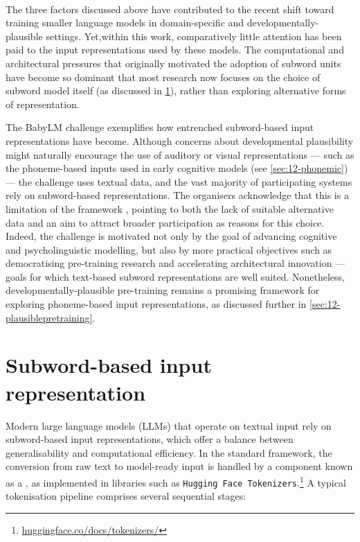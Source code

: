 \paragraph{} The three factors discussed above have contributed to the recent shift toward training smaller language models in domain-specific and developmentally-plausible settings. Yet,within this work, comparatively little attention has been paid to the input representations used by these models. The computational and architectural pressures that originally motivated the adoption of subword units have become so dominant that most research now focuses on the choice of subword model itself (as discussed in \cref{sec:12-subword}), rather than exploring alternative forms of representation.

The BabyLM challenge exemplifies how entrenched subword-based input representations have become. Although concerns about developmental plausibility might naturally encourage the use of auditory or visual representations --- such as the phoneme-based inputs used in early cognitive models (see \cref{sec:12-phonemic}) --- the challenge uses textual data, and the vast majority of participating systems rely on subword-based representations. The organisers acknowledge that this is a limitation of the framework \citep{wilcox2025}, pointing to both the lack of suitable alternative data and an aim to attract broader participation as reasons for this choice. Indeed, the challenge is motivated not only by the goal of advancing cognitive and psycholinguistic modelling, but also by more practical objectives such as democratising pre-training research and accelerating architectural innovation --- goals for which text-based subword representations are well suited. Nonetheless, developmentally-plausible pre-training remains a promising framework for exploring phoneme-based input representations, as discussed further in \cref{sec:12-plausiblepretraining}.

\section{Subword-based input representation}\label{sec:12-subword}

Modern large language models (LLMs) that operate on textual input rely on subword-based input representations, which offer a balance between generalisability and computational efficiency. In the standard framework, the conversion from raw text to model-ready input is handled by a component known as a , as implemented in libraries such as \texttt{Hugging Face Tokenizers}.\footnote{\href{https://huggingface.co/docs/tokenizers/index}{huggingface.co/docs/tokenizers/}} A typical tokenisation pipeline comprises several sequential stages:

